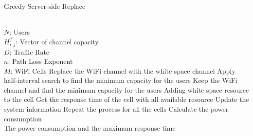 \begin{algorithm}[t]
\small
\caption{Greedy Server-side Replace}
\label{algorithm:mape}
\begin{algorithmic}[1]
\REQUIRE  ~~\\
$N$: Users\\
$H_{i,j}^f$: Vector of channel capacity\\
$D$: Traffic Rate\\
$n$: Path Loss Exponent \\
$M$: WiFi Cells
\STATE Replace the WiFi channel with the white space channel
\STATE Apply half-interval search to find the minimum capacity for the users
\STATE Keep the WiFi channel and find the minimum capacity for the users
\STATE Adding white space resource to the cell
\ELSE 
\STATE Get the response time of the cell with all available resource
\ENDIF
\STATE Update the system information
\STATE Repeat the process for all the cells
\STATE Calculate the power consumption
\ENSURE ~~\\
The power consumption and the maximum response time\\
\end{algorithmic}
\end{algorithm}

